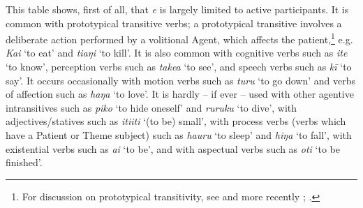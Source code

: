 \begin{table}
\caption{Verb classes and the use of \textit{e}}
\label{tab:59}
\end{table}

This table shows, first of all, that \textit{e} is largely limited to active participants. It is common with prototypical transitive verbs; a prototypical transitive involves a deliberate action performed by a volitional Agent, which affects the patient,\footnote{\label{fn:395}For discussion on prototypical transitivity, see \citet{HopperThompson1980} and more recently \citet{Ball2007}; \citet{Naess2007}.} e.g. \textit{Kai} ‘to eat’ and \textit{tiaŋi} ‘to kill’. It is also common with cognitive verbs such as \textit{{\ꞌ}ite} ‘to know’, perception verbs such as \textit{take{\ꞌ}a} ‘to see’, and speech verbs such as \textit{kī} ‘to say’. It occurs occasionally with motion verbs such as \textit{turu} ‘to go down’ and verbs of affection such as \textit{haŋa} ‘to love’. It is hardly – if ever – used  with other agentive intransitives such as \textit{piko} ‘to hide oneself’ and \textit{ruruku} ‘to dive’, with adjectives/statives such as \textit{{\ꞌ}iti{\ꞌ}iti} ‘(to be) small’, with process verbs (verbs which have a Patient or Theme subject) such as \textit{ha{\ꞌ}uru} ‘to sleep’ and \textit{hiŋa} ‘to fall’, with existential verbs such as \textit{ai} ‘to be’, and with aspectual verbs such as \textit{oti} ‘to be finished’.

